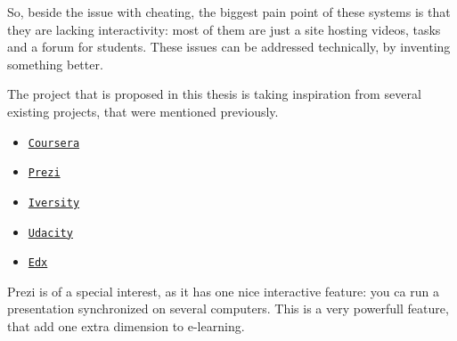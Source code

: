 So, beside the issue with cheating, the biggest pain point of these systems is that they are
lacking interactivity: most of them are just a site hosting videos, tasks and a forum for students.
These issues can be addressed technically, by inventing something better.

The project that is proposed in this thesis is taking inspiration from several existing projects, that
were mentioned previously.
\begin{itemize}
\item \href{https://coursera.org}{\texttt{Coursera}}
\item \href{https://prezi.com}{\texttt{Prezi}}
\item \href{htpps://iversity.org}{\texttt{Iversity}}
\item \href{https://udacity.com}{\texttt{Udacity}}
\item \href{https://edx.com}{\texttt{Edx}}
\end{itemize}
Prezi is of a special interest, as it has one nice interactive feature: you ca run
a presentation synchronized on several computers. This is a very powerfull feature,
that add one extra dimension to e-learning.
